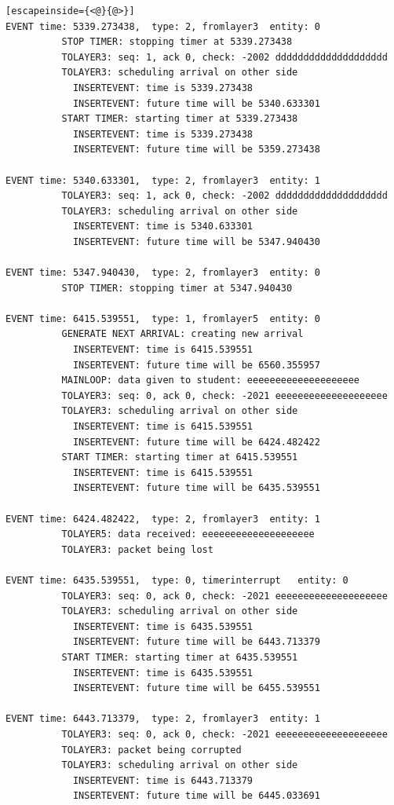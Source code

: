 \documentclass[paper=a4, fontsize=11pt]{scrartcl}
\numberwithin{equation}{section}		%
\numberwithin{figure}{section}			%
\numberwithin{table}{section}				%
\begin{document}
\begin{lstlisting}[escapeinside={<@}{@>}]
EVENT time: 5339.273438,  type: 2, fromlayer3  entity: 0
          STOP TIMER: stopping timer at 5339.273438
          TOLAYER3: seq: 1, ack 0, check: -2002 dddddddddddddddddddd
          TOLAYER3: scheduling arrival on other side
            INSERTEVENT: time is 5339.273438
            INSERTEVENT: future time will be 5340.633301
          START TIMER: starting timer at 5339.273438
            INSERTEVENT: time is 5339.273438
            INSERTEVENT: future time will be 5359.273438

EVENT time: 5340.633301,  type: 2, fromlayer3  entity: 1
          TOLAYER3: seq: 1, ack 0, check: -2002 dddddddddddddddddddd
          TOLAYER3: scheduling arrival on other side
            INSERTEVENT: time is 5340.633301
            INSERTEVENT: future time will be 5347.940430

EVENT time: 5347.940430,  type: 2, fromlayer3  entity: 0
          STOP TIMER: stopping timer at 5347.940430

EVENT time: 6415.539551,  type: 1, fromlayer5  entity: 0
          GENERATE NEXT ARRIVAL: creating new arrival
            INSERTEVENT: time is 6415.539551
            INSERTEVENT: future time will be 6560.355957
          MAINLOOP: data given to student: eeeeeeeeeeeeeeeeeeee
          TOLAYER3: seq: 0, ack 0, check: -2021 eeeeeeeeeeeeeeeeeeee
          TOLAYER3: scheduling arrival on other side
            INSERTEVENT: time is 6415.539551
            INSERTEVENT: future time will be 6424.482422
          START TIMER: starting timer at 6415.539551
            INSERTEVENT: time is 6415.539551
            INSERTEVENT: future time will be 6435.539551

EVENT time: 6424.482422,  type: 2, fromlayer3  entity: 1
          TOLAYER5: data received: eeeeeeeeeeeeeeeeeeee
          TOLAYER3: packet being lost

EVENT time: 6435.539551,  type: 0, timerinterrupt   entity: 0
          TOLAYER3: seq: 0, ack 0, check: -2021 eeeeeeeeeeeeeeeeeeee
          TOLAYER3: scheduling arrival on other side
            INSERTEVENT: time is 6435.539551
            INSERTEVENT: future time will be 6443.713379
          START TIMER: starting timer at 6435.539551
            INSERTEVENT: time is 6435.539551
            INSERTEVENT: future time will be 6455.539551

EVENT time: 6443.713379,  type: 2, fromlayer3  entity: 1
          TOLAYER3: seq: 0, ack 0, check: -2021 eeeeeeeeeeeeeeeeeeee
          TOLAYER3: packet being corrupted
          TOLAYER3: scheduling arrival on other side
            INSERTEVENT: time is 6443.713379
            INSERTEVENT: future time will be 6445.033691


\end{lstlisting}
\end{document}
